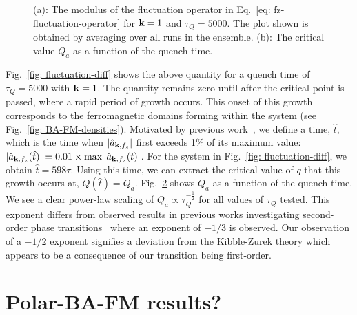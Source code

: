 \begin{figure}[tb]
\begin{subfigure}{0.45\textwidth}
        \caption{\label{fig: Q_a-scaling}}
    \end{subfigure}
    \caption{(a): The modulus of the fluctuation operator in
    Eq.~\eqref{eq: fz-fluctuation-operator} for \(\vb{k}=1\) and
    \(\tau_Q=5000\).
    The plot shown is obtained by averaging over all runs in the ensemble.
    (b): The critical value \(Q_a\) as a function of the quench time.
    }
\end{figure}
Fig.~\ref{fig: fluctuation-diff} shows the above quantity for a quench time
of \(\tau_Q=5000\) with \(\vb{k}=1\).
The quantity remains zero until after the critical point is passed, where
a rapid period of growth occurs.
This onset of this growth corresponds to the ferromagnetic domains forming
within the system (see Fig.~\ref{fig: BA-FM-densities}).
Motivated by previous work~\cite{Damski2007, Qiu2020}, we define a time,
\( \hat{t} \), which is the time when \(|\hat{a}_{\vb{k}, {f_z}}|\) first exceeds
1\% of its maximum value: \(|\hat{a}_{\vb{k}, {f_z}}(\hat{t})| =
0.01\times \max|\hat{a}_{\vb{k}, {f_z}}(t)|\).
For the system in Fig.~\ref{fig: fluctuation-diff}, we obtain
\(\hat{t}=598\tau \).
Using this time, we can extract the critical value of \( q \) that this growth
occurs at, \(Q(\hat{t}) = Q_a\).
Fig.~\ref{fig: Q_a-scaling} shows \(Q_a\) as a function of the quench time.
We see a clear power-law scaling of \(Q_a \propto \tau_Q^{-\frac{1}{2}}\) for
all values of \( \tau_Q \) tested.
This exponent differs from observed results in previous works investigating
second-order phase transitions~\cite{Damski2007, Anquez2016, Swislocki2013}
where an exponent of \(-1/3\) is observed.
Our observation of a \(-1/2\) exponent signifies a deviation from
the Kibble-Zurek theory which appears to be a consequence of our transition
being first-order.

\section{Polar-BA-FM results?}
